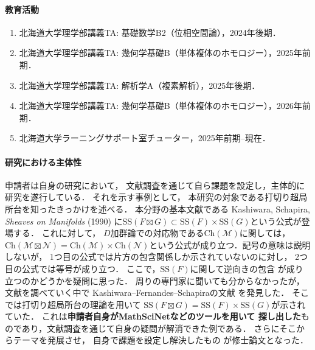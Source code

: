 \documentclass[11pt,a4paper,uplatex,dvipdfmx]{ujarticle} 		%
\newcommand{\研究課題名}{打切り超局所台を用いた層のフーリエ変換の研究とシンプレクティック幾何への応用}
\newcommand{\研究機関名}{北海道大学}
\newcommand{\研究代表者氏名}{大柴寿浩}
\begin{document}
\paragraph{教育活動}
\begin{enumerate}[a]
	\item 北海道大学理学部講義TA: 基礎数学B2（位相空間論），2024年後期．
	\item 北海道大学理学部講義TA: 幾何学基礎B（単体複体のホモロジー），2025年前期．
	\item 北海道大学理学部講義TA: 解析学A（複素解析），2025年後期．
	\item 北海道大学理学部講義TA: 幾何学基礎B（単体複体のホモロジー），2026年前期．
	\item 北海道大学ラーニングサポート室チューター，2025年前期--現在．
\end{enumerate}
\paragraph*{研究における主体性}
申請者は自身の研究において，
文献調査を通じて自ら課題を設定し，主体的に研究を遂行している．
それを示す事例として，
本研究の対象である打切り超局所台を知ったきっかけを述べる．
本分野の基本文献である Kashiwara, Schapira, 
\textit{Sheaves on Manifolds} (1990) 
に\(
	\mathrm{SS}(F\mathbin{\boxtimes} G)
	\subset
	\mathrm{SS}(F)\times\mathrm{SS}(G)
\)という公式が登場する．
これに対して，
\(D\)加群論での対応物である\(\mathrm{Ch}(\mathcal{M})\)に関しては，
\(
	\mathrm{Ch}(\mathcal{M}\mathbin{\boxtimes} \mathcal{N})
	=
	\mathrm{Ch}(\mathcal{M})\times\mathrm{Ch}(\mathcal{N})
\)という公式が成り立つ．記号の意味は説明しないが，
1つ目の公式では片方の包含関係しか示されていないのに対し，
2つ目の公式では等号が成り立つ．
ここで，\(\mathrm{SS}(F)\)に関して逆向きの包含
が成り立つのかどうかを疑問に思った．
周りの専門家に聞いても分からなかったが，
文献を調べていく中で Kashiwara--Fernandes--Schapiraの文献
を発見した．
そこでは打切り超局所台の理論を用いて
\(
	\mathrm{SS}(F\mathbin{\boxtimes} G)
	=
	\mathrm{SS}(F)\times\mathrm{SS}(G)
\)が示されていた．
これは\textbf{申請者自身がMathSciNetなどのツールを用いて
探し出した}ものであり，文献調査を通じて自身の疑問が解消できた例である．
さらにそこからテーマを発展させ，
自身で課題を設定し解決したもの
が修士論文となった．
\end{document}
